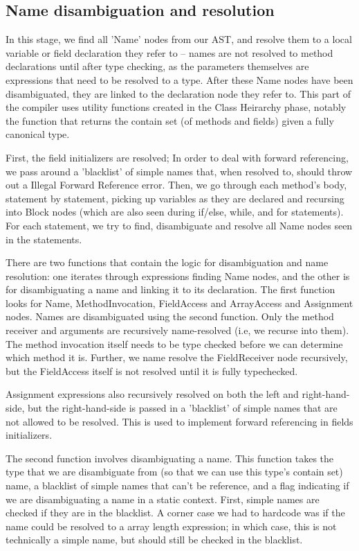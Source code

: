 \documentclass[12pt]{article}
\begin{document}
\subsection{Name disambiguation and resolution}

In this stage, we find all 'Name' nodes from our AST, and resolve them to a
local variable or field declaration they refer to -- names are not resolved to method
declarations until after type checking, as the parameters themselves are expressions
that need to be resolved to a type.  After these Name nodes have been
disambiguated, they are linked to the declaration node they refer to. This part
of the compiler uses utility functions created in the Class Heirarchy phase,
notably the function that returns the contain set (of methods and fields) given
a fully canonical type.

First, the field initializers are resolved;  In order to deal with forward
referencing, we pass around a 'blacklist' of simple names that, when resolved to,
should throw out a Illegal Forward Reference error. Then, we go through each
method's body, statement by statement, picking up variables as they are declared
and recursing into Block nodes (which are also seen during if/else, while, and
for statements).  For each statement, we try to find, disambiguate and resolve
all Name nodes seen in the statements.

There are two functions that contain the logic for disambiguation and name
resolution:  one iterates through expressions finding Name nodes,
and the other is for disambiguating a name and linking it to its declaration.  The first
function looks for Name, MethodInvocation, FieldAccess and ArrayAccess and
Assignment nodes.  Names are disambiguated using the second function.  Only the
method receiver and arguments are recursively name-resolved (i.e, we recurse
into them).  The method invocation itself needs to be type checked before we can
determine which method it is.  Further, we name resolve the FieldReceiver node
recursively, but the FieldAccess itself is not resolved until it is fully
typechecked.

Assignment expressions also recursively resolved on both the left and
right-hand-side, but the right-hand-side is passed in a 'blacklist' of simple
names that are not allowed to be resolved.  This is used to implement forward
referencing in fields initializers.

The second function involves disambiguating a name.  This function takes the
type that we are disambiguate from (so that we can use this type's contain set) name,
a blacklist of simple names that can't be reference, and a flag indicating
if we are disambiguating a name in a static context.  First, simple names are
checked if they are in the blacklist.  A corner case we had to hardcode was if
the name could be resolved to a array length expression;  in which case, this is
not technically a simple name, but should still be checked in the blacklist.
\end{document}
